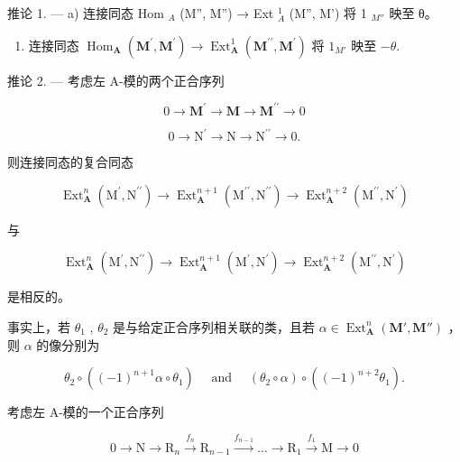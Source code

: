 推论 1. --- a) 连接同态 Hom \(_{A}\) (M'', M'') → Ext \(_{A}^{1}\) (M'', M') 将 1 \(_{M''}\) 映至 θ。

\begin{enumerate}
\def\labelenumi{\alph{enumi})}
\setcounter{enumi}{1}
\tightlist
\item
  连接同态 \(\operatorname{Hom}_{\mathbf{A}}(\mathbf{M}^{\prime},\mathbf{M}^{\prime})\to\operatorname{Ext}_{\mathbf{A}}^{1}(\mathbf{M}^{\prime\prime},\mathbf{M}^{\prime})\) 将 \(1_{M'}\) 映至 \(-\theta\).
\end{enumerate}

推论 2. --- 考虑左 A-模的两个正合序列

\[
0 \rightarrow \mathbf {M} ^ {\prime} \rightarrow \mathbf {M} \rightarrow \mathbf {M} ^ {\prime \prime} \rightarrow 0
\]

\[
0 \rightarrow \mathrm{N} ^ {\prime} \rightarrow \mathrm{N} \rightarrow \mathrm{N} ^ {\prime \prime} \rightarrow 0.
\]

则连接同态的复合同态

\[
\operatorname{Ext} _ {\mathbf {A}} ^ {n} \left(\mathrm{M} ^ {\prime}, \mathrm{N} ^ {\prime \prime}\right)\rightarrow \operatorname{Ext} _ {\mathbf {A}} ^ {n + 1} \left(\mathrm{M} ^ {\prime \prime}, \mathrm{N} ^ {\prime \prime}\right)\rightarrow \operatorname{Ext} _ {\mathbf {A}} ^ {n + 2} \left(\mathrm{M} ^ {\prime \prime}, \mathrm{N} ^ {\prime}\right)
\]

与

\[
\operatorname{Ext} _ {\mathbf {A}} ^ {n} \left(\mathrm{M} ^ {\prime}, \mathrm{N} ^ {\prime \prime}\right)\rightarrow \operatorname{Ext} _ {\mathbf {A}} ^ {n + 1} \left(\mathrm{M} ^ {\prime}, \mathrm{N} ^ {\prime}\right)\rightarrow \operatorname{Ext} _ {\mathbf {A}} ^ {n + 2} \left(\mathrm{M} ^ {\prime \prime}, \mathrm{N} ^ {\prime}\right)
\]

是相反的。

事实上，若 \(\theta_{1}\) , \(\theta_{2}\) 是与给定正合序列相关联的类，且若 \(\alpha \in \operatorname{Ext}_{\mathbf{A}}^{n}(\mathbf{M}', \mathbf{M}'')\) ，则 \(\alpha\) 的像分别为

\[
\theta_ {2} \circ ((- 1) ^ {n + 1} \alpha \circ \theta_ {1}) \quad \text { and } \quad (\theta_ {2} \circ \alpha) \circ ((- 1) ^ {n + 2} \theta_ {1}).
\]

考虑左 A-模的一个正合序列

\[
0 \rightarrow \mathrm{N} \rightarrow \mathrm{R} _ {n} \xrightarrow {f _ {n}} \mathrm{R} _ {n - 1} \xrightarrow {f _ {n - 1}} \dots \rightarrow \mathrm{R} _ {1} \xrightarrow {f _ {1}} \mathrm{M} \rightarrow 0\tag{S}
\]

